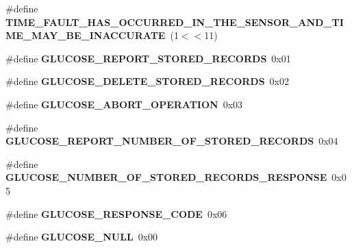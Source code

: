 \begin{DoxyCompactItemize}
\item 
\#define {\bfseries T\+I\+M\+E\+\_\+\+F\+A\+U\+L\+T\+\_\+\+H\+A\+S\+\_\+\+O\+C\+C\+U\+R\+R\+E\+D\+\_\+\+I\+N\+\_\+\+T\+H\+E\+\_\+\+S\+E\+N\+S\+O\+R\+\_\+\+A\+N\+D\+\_\+\+T\+I\+M\+E\+\_\+\+M\+A\+Y\+\_\+\+B\+E\+\_\+\+I\+N\+A\+C\+C\+U\+R\+A\+TE}~(1$<$$<$11)\hypertarget{group___b_l_e___g_s_ga901867af7b9479bab2c52974529b2c96}{}\label{group___b_l_e___g_s_ga901867af7b9479bab2c52974529b2c96}

\item 
\#define {\bfseries G\+L\+U\+C\+O\+S\+E\+\_\+\+R\+E\+P\+O\+R\+T\+\_\+\+S\+T\+O\+R\+E\+D\+\_\+\+R\+E\+C\+O\+R\+DS}~0x01\hypertarget{group___b_l_e___g_s_gad557e94fdf50f607949525b2e7196c1c}{}\label{group___b_l_e___g_s_gad557e94fdf50f607949525b2e7196c1c}

\item 
\#define {\bfseries G\+L\+U\+C\+O\+S\+E\+\_\+\+D\+E\+L\+E\+T\+E\+\_\+\+S\+T\+O\+R\+E\+D\+\_\+\+R\+E\+C\+O\+R\+DS}~0x02\hypertarget{group___b_l_e___g_s_ga16dcd69bb1048fcf6428a2a005f1f2a7}{}\label{group___b_l_e___g_s_ga16dcd69bb1048fcf6428a2a005f1f2a7}

\item 
\#define {\bfseries G\+L\+U\+C\+O\+S\+E\+\_\+\+A\+B\+O\+R\+T\+\_\+\+O\+P\+E\+R\+A\+T\+I\+ON}~0x03\hypertarget{group___b_l_e___g_s_ga4f381a27815a6d1fd25f8643bf4530ab}{}\label{group___b_l_e___g_s_ga4f381a27815a6d1fd25f8643bf4530ab}

\item 
\#define {\bfseries G\+L\+U\+C\+O\+S\+E\+\_\+\+R\+E\+P\+O\+R\+T\+\_\+\+N\+U\+M\+B\+E\+R\+\_\+\+O\+F\+\_\+\+S\+T\+O\+R\+E\+D\+\_\+\+R\+E\+C\+O\+R\+DS}~0x04\hypertarget{group___b_l_e___g_s_ga22bad536df10e01d7e334b76355396e7}{}\label{group___b_l_e___g_s_ga22bad536df10e01d7e334b76355396e7}

\item 
\#define {\bfseries G\+L\+U\+C\+O\+S\+E\+\_\+\+N\+U\+M\+B\+E\+R\+\_\+\+O\+F\+\_\+\+S\+T\+O\+R\+E\+D\+\_\+\+R\+E\+C\+O\+R\+D\+S\+\_\+\+R\+E\+S\+P\+O\+N\+SE}~0x05\hypertarget{group___b_l_e___g_s_gabdad6b9bdbd170a23d8204ddd8e05121}{}\label{group___b_l_e___g_s_gabdad6b9bdbd170a23d8204ddd8e05121}

\item 
\#define {\bfseries G\+L\+U\+C\+O\+S\+E\+\_\+\+R\+E\+S\+P\+O\+N\+S\+E\+\_\+\+C\+O\+DE}~0x06\hypertarget{group___b_l_e___g_s_gab1c2b0849b15a83ccf2a81a279eda153}{}\label{group___b_l_e___g_s_gab1c2b0849b15a83ccf2a81a279eda153}

\item 
\#define {\bfseries G\+L\+U\+C\+O\+S\+E\+\_\+\+N\+U\+LL}~0x00\hypertarget{group___b_l_e___g_s_ga530f914c25645412148565504b12c956}{}\label{group___b_l_e___g_s_ga530f914c25645412148565504b12c956}


\end{DoxyCompactItemize}
